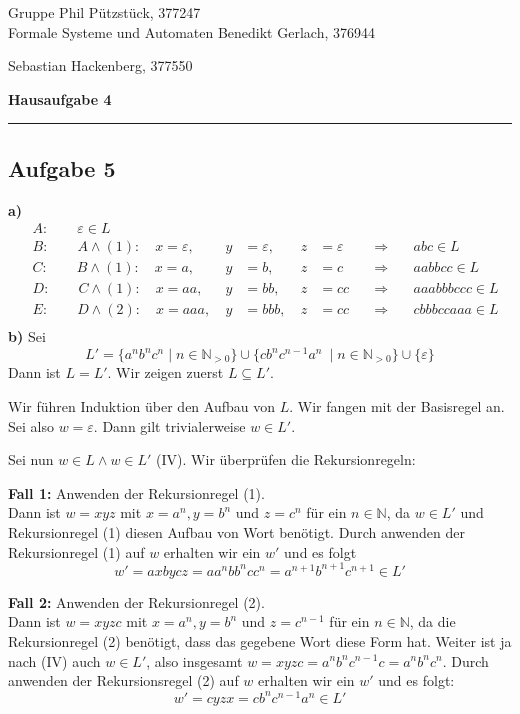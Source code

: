\documentclass[a4paper,graphics,11pt]{article}
\newcommand{\aufgabe}[1]{\subsection*{Aufgabe #1}}
\begin{document}
\noindent Gruppe              \hfill Phil Pützstück, 377247\\
\noindent Formale Systeme und Automaten \hfill Benedikt Gerlach, 376944\\
\strut\hfill Sebastian Hackenberg, 377550\\
\begin{center}
	\LARGE{\textbf{Hausaufgabe 4}}
\end{center}
\begin{center}
\rule[0.1ex]{\textwidth}{1pt}
\end{center}

\aufgabe{5}
\textbf{a)}
\begin{align*}
    &A: \qquad \varepsilon \in L\\
    &B: \qquad A \land (1):\quad x=\varepsilon, &y&=\varepsilon, &z&=\varepsilon &\Longrightarrow&\quad abc \in L\\
    &C: \qquad B \land (1):\quad x=a, &y&=b, &z&=c &\Longrightarrow&\quad aabbcc \in L\\
    &D: \qquad C \land (1):\quad x=aa, &y&=bb, &z&=cc &\Longrightarrow&\quad aaabbbccc \in L\\
    &E: \qquad D \land (2):\quad x=aaa,\ &y&=bbb,\ &z&=cc\quad &\Longrightarrow&\quad cbbbccaaa \in L\\
\end{align*}
\textbf{b)}
Sei
$$
    L' = \{a^nb^nc^n \mid n \in \mathbb{N}_{>0}\} \cup \{cb^nc^{n-1}a^n\ \mid n \in \mathbb{N}_{>0}\} \cup \{\varepsilon\}
$$
Dann ist $L = L'$. Wir zeigen zuerst $L \subseteq L'$.

Wir führen Induktion über den Aufbau von $L$.
Wir fangen mit der Basisregel an. Sei also $w = \varepsilon$. Dann gilt trivialerweise $w \in L'$.

Sei nun $w \in L \land w \in L'$ (IV). Wir überprüfen die Rekursionregeln:

\textbf{Fall 1:} Anwenden der Rekursionregel (1).\\
Dann ist $w = xyz$ mit $x = a^n, y= b^n$  und $z = c^n$ für ein $n \in \mathbb{N}$, da $w \in L'$ und
Rekursionregel (1) diesen Aufbau von Wort benötigt.
Durch anwenden der Rekursionregel (1) auf $w$ erhalten wir ein $w'$ und es folgt
$$
    w' = axbycz = aa^nbb^ncc^n = a^{n+1}b^{n+1}c^{n+1} \in L'
$$

\textbf{Fall 2:} Anwenden der Rekursionregel (2).\\
Dann ist $w = xyzc$ mit $x = a^n, y=b^n$ und $z = c^{n-1}$ für ein $n \in \mathbb{N}$, da die Rekursionregel (2)
benötigt, dass das gegebene Wort diese Form hat. Weiter ist ja nach (IV) auch $w \in L'$, also insgesamt
$w = xyzc = a^nb^nc^{n-1}c = a^nb^nc^n$. Durch anwenden der Rekursionsregel (2) auf $w$ erhalten wir ein
$w'$ und es folgt:
$$
    w' = cyzx = cb^nc^{n-1}a^n \in L'
$$
\end{document}
